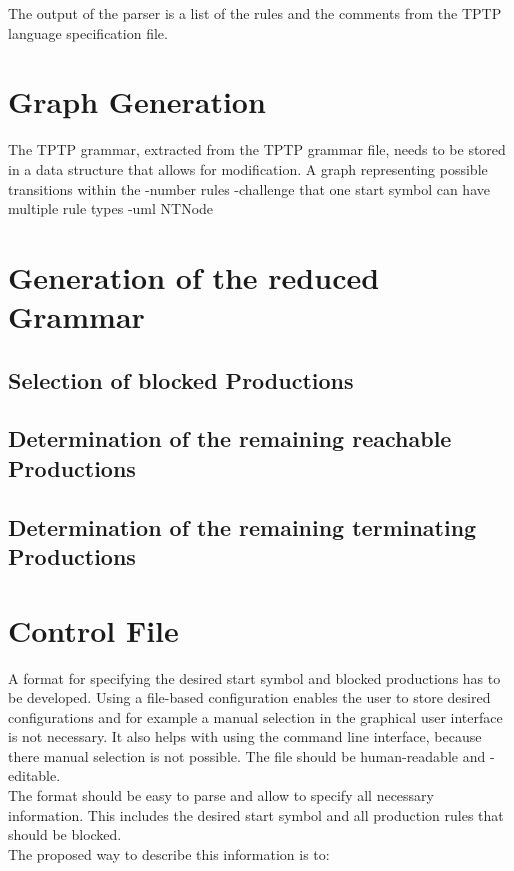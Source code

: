 The output of the parser is a list of the rules and the comments from the \ac{TPTP} language specification file.
\section{Graph Generation}\label{sec:ConceptGraphGeneration}
The \ac{TPTP} grammar, extracted from the \ac{TPTP} grammar file, needs to be stored in a data structure that allows for modification.
A graph representing possible transitions within the 
-number rules
-challenge that one start symbol can have multiple rule types
-uml NTNode
\section{Generation of the reduced Grammar}\label{sec:ConceptGenerateReducedGrammar}

\subsection{Selection of blocked Productions}

\subsection{Determination of the remaining reachable Productions}

\subsection{Determination of the remaining terminating Productions}

\section{Control File}\label{sec:ConceptControlFile}
A format for specifying the desired start symbol and blocked productions has to be developed.
Using a file-based configuration enables the user to store desired configurations and for example a manual selection in the graphical user interface is not necessary.
It also helps with using the command line interface, because there manual selection is not possible.
The file should be human-readable and -editable.\\
The format should be easy to parse and allow to specify all necessary information.
This includes the desired start symbol and all production rules that should be blocked.\\
The proposed way to describe this information is to:

